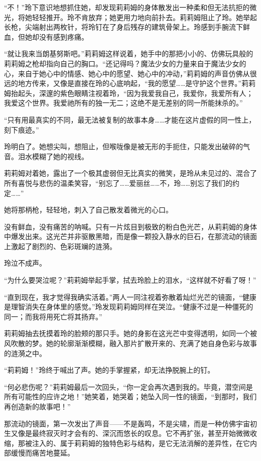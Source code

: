 “不！”玲下意识地想抓住她，却发现莉莉姆的身体散发出一种柔和但无法抗拒的微光，将她轻轻推开。玲不肯放弃；她更用力地向前扑去。莉莉姆阻止了玲。她举起长枪，尖端射出两枚针，将玲钉在了身后残存的建筑骨架上。玲感到手腕流下鲜血，但她却没有感到疼痛。

“就让我来当朗基努斯吧。”莉莉姆这样说着，她手中的那把小小的、仿佛玩具般的莉莉姆之枪却指向自己的胸口。“还记得吗？魔法少女的力量来自于魔法少女的心，来自于她心中的情感、她心中的愿望、她心中的冲动，”莉莉姆的声音仿佛从很远的地方传来，又像是直接在玲的心底响起，“我的愿望……是守护这个世界。”莉莉姆抬起头，深邃的紫色眼睛注视着玲，“因为我爱我自己，我爱你，我爱所有人；我爱这个世界。我爱祂所有的独一无二；这绝不是无差别的同一所能抹杀的。”

“只有用最真实的不同，最无法被复制的故事本身……才能在这片虚假的同一性上，刻下痕迹。”

玲明白了。她想尖叫，想阻止，但喉咙像是被无形的手扼住，只能发出破碎的气音。泪水模糊了她的视线。

莉莉姆对着她，露出了一个极其虚弱但无比真实的微笑，是玲从未见过的、混合了所有喜悦与悲伤的温柔笑容，“别忘了……爱丽丝……不，玲……别忘了我们的约定……”

她将那柄枪，轻轻地，刺入了自己散发着微光的心口。

没有鲜血，没有痛苦的呐喊。只有一片炫目到极致的粉白色光芒，从莉莉姆的身体中爆发出来。这光芒并非驱散黑暗，而是像一颗投入静水的巨石，在那流动的镜面上激起了剧烈的、色彩斑斓的涟漪。

玲泣不成声。

“为什么要哭泣呢？”莉莉姆举起手掌，拭去玲脸上的泪水，“这样就不好看了呀！”

“直到现在，我才觉得我确实活着。”两人一同注视着弥散着灿烂光芒的镜面，“健康是理智消失在身体里的感觉。”玲发现莉莉姆同样在哭泣。“健康不过是一种僵死的同一；而我将用死亡将其扬弃。”

莉莉姆抽去抚摸着玲的脸颊的那只手。她的身影在这光芒中变得透明，如同一个被风吹散的梦。她的轮廓渐渐模糊，融入那片扩散开来的、充满了她自身色彩与故事的涟漪之中。

“莉莉姆！”玲终于喊出了声。她的手掌握紧，却无法挣脱腕上的钉。

“何必悲伤呢？”莉莉姆最后一次回头，“你一定会再次遇到我的。毕竟，潜空间是所有可能性的应许之地！”她笑着，她哭着；她坠入同一性的镜面，“到那时，我们再创造新的故事吧！”

那流动的镜面，第一次发出了声音——不是轰鸣，不是尖啸，而是一种仿佛宇宙初生又像是最终寂灭时才会有的、深沉而悠长的叹息。它不再扩张，甚至开始微微收缩，那被注入的、属于莉莉姆的独特色彩与结构，是它无法消解的差异性，在它内部缓慢而痛苦地蔓延。

